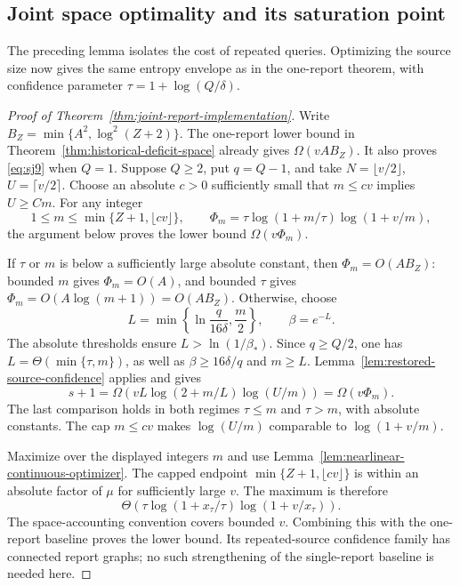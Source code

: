 \documentclass[11pt,letterpaper]{article}
\numberwithin{equation}{section}
\begin{document}
\subsection{Joint space optimality and its saturation point}

The preceding lemma isolates the cost of repeated queries.
Optimizing the source size now gives the same entropy envelope as in the one-report theorem, with confidence parameter $\tau=1+\log(Q/\delta)$.

\begin{proof}[Proof of Theorem~\ref{thm:joint-report-implementation}]
Write $B_Z=\min\{A^2,\log^2(Z+2)\}$.
The one-report lower bound in Theorem~\ref{thm:historical-deficit-space} already gives $\Omega(vAB_Z)$.
It also proves \eqref{eq:sj9} when $Q=1$.
Suppose $Q\ge2$, put $q=Q-1$, and take $N=\lfloor v/2\rfloor$, $U=\lceil v/2\rceil$.
Choose an absolute $c>0$ sufficiently small that $m\le cv$ implies $U\ge Cm$.
For any integer
\[
 1\le m\le\min\{Z+1,\lfloor cv\rfloor\},
 \qquad
 \Phi_m=\tau\log(1+m/\tau)\log(1+v/m),
\]
the argument below proves the lower bound $\Omega(v\Phi_m)$.

If $\tau$ or $m$ is below a sufficiently large absolute constant, then $\Phi_m=O(AB_Z)$: bounded $m$ gives $\Phi_m=O(A)$, and bounded $\tau$ gives $\Phi_m=O(A\log(m+1))=O(AB_Z)$.
Otherwise, choose
\begin{equation}
L=\min\left\{\ln\frac{q}{16\delta},\frac m2\right\},
 \qquad \beta=e^{-L}.                             \label{eq:sj10}
\end{equation}
The absolute thresholds ensure $L>\ln(1/\beta_*)$.
Since $q\ge Q/2$, one has $L=\Theta(\min\{\tau,m\})$, as well as $\beta\ge16\delta/q$ and $m\ge L$.
Lemma~\ref{lem:restored-source-confidence} applies and gives
\begin{equation}
s+1=\Omega\!\left(
 vL\log(2+m/L)\log(U/m)\right)
     =\Omega(v\Phi_m).                            \label{eq:sj11}
\end{equation}
The last comparison holds in both regimes $\tau\le m$ and $\tau>m$, with absolute constants.
The cap $m\le cv$ makes $\log(U/m)$ comparable to $\log(1+v/m)$.

Maximize over the displayed integers $m$ and use Lemma~\ref{lem:nearlinear-continuous-optimizer}.
The capped endpoint $\min\{Z+1,\lfloor cv\rfloor\}$ is within an absolute factor of $\mu$ for sufficiently large $v$.
The maximum is therefore
\[
 \Theta\!\left(
 \tau\log(1+x_\tau/\tau)\log(1+v/x_\tau)\right).
\]
The space-accounting convention covers bounded $v$.
Combining this with the one-report baseline proves the lower bound.
Its repeated-source confidence family has connected report graphs; no such strengthening of the single-report baseline is needed here.


\end{proof}
\end{document}

